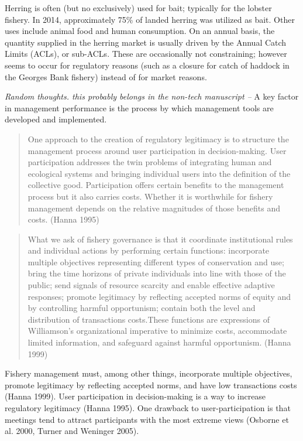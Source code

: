 \documentclass[]{article}
\begin{document}
Herring is often (but no exclusively) used for bait; typically for the
lobster fishery. In 2014, approximately 75\% of landed herring was
utilized as bait. Other uses include animal food and human consumption.
On an annual basis, the quantity supplied in the herring market is
usually driven by the Annual Catch Limits (ACLs), or sub-ACLs. These are
occasionally not constraining; however seems to occur for regulatory
reasons (such as a closure for catch of haddock in the Georges Bank
fishery) instead of for market reasons. \fi

\emph{Random thoughts. this probably belongs in the non-tech manuscript
--} A key factor in management performance is the process by which
management tools are developed and implemented.

\begin{quote}
One approach to the creation of regulatory legitimacy is to structure
the management process around user participation in decision-making.
User participation addresses the twin problems of integrating human and
ecological systems and bringing individual users into the definition of
the collective good. Participation offers certain benefits to the
management process but it also carries costs. Whether it is worthwhile
for fishery management depends on the relative magnitudes of those
benefits and costs. (Hanna 1995)
\end{quote}

\begin{quote}
What we ask of fishery governance is that it coordinate institutional
rules and individual actions by performing certain functions:
incorporate multiple objectives representing different types of
conservation and use; bring the time horizons of private individuals
into line with those of the public; send signals of resource scarcity
and enable effective adaptive responses; promote legitimacy by
reflecting accepted norms of equity and by controlling harmful
opportunism; contain both the level and distribution of transactions
costs.These functions are expressions of Williamson's organizational
imperative to minimize costs, accommodate limited information, and
safeguard against harmful opportunism. (Hanna 1999)
\end{quote}

Fishery management must, among other things, incorporate multiple
objectives, promote legitimacy by reflecting accepted norms, and have
low transactions costs (Hanna 1999). User participation in
decision-making is a way to increase regulatory legitimacy (Hanna 1995).
One drawback to user-participation is that meetings tend to attract
participants with the most extreme views (Osborne et al. 2000, Turner
and Weninger 2005).
\end{document}
